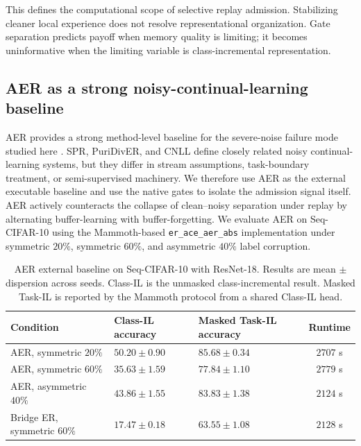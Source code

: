 \documentclass[preprint,12pt]{elsarticle}
\begin{document}
This defines the computational scope of selective replay admission. Stabilizing cleaner local experience does not resolve representational organization. Gate separation predicts payoff when memory quality is limiting; it becomes uninformative when the limiting variable is class-incremental representation.

\subsection{AER as a strong noisy-continual-learning baseline}

AER provides a strong method-level baseline for the severe-noise failure mode studied here \cite{Millunzi2024AER}. SPR, PuriDivER, and CNLL define closely related noisy continual-learning systems, but they differ in stream assumptions, task-boundary treatment, or semi-supervised machinery. We therefore use AER as the external executable baseline and use the native gates to isolate the admission signal itself. AER actively counteracts the collapse of clean--noisy separation under replay by alternating buffer-learning with buffer-forgetting. We evaluate AER on Seq-CIFAR-10 using the Mammoth-based \texttt{er\_ace\_aer\_abs} implementation under symmetric $20\%$, symmetric $60\%$, and asymmetric $40\%$ label corruption.

\begin{table}[htbp]
\centering
\caption{AER external baseline on Seq-CIFAR-10 with ResNet-18. Results are mean $\pm$ dispersion across seeds. Class-IL is the unmasked class-incremental result. Masked Task-IL is reported by the Mammoth protocol from a shared Class-IL head.}
\label{tab:aer_external}
\small
\begin{tabularx}{\textwidth}{l >{\centering\arraybackslash}X >{\centering\arraybackslash}X c}
\toprule
Condition & Class-IL accuracy & Masked Task-IL accuracy & Runtime \\
\midrule
AER, symmetric $20\%$ & $50.20 \pm 0.90$ & $85.68 \pm 0.34$ & $2707$ s \\
AER, symmetric $60\%$ & $35.63 \pm 1.59$ & $77.84 \pm 1.10$ & $2779$ s \\
AER, asymmetric $40\%$ & $43.86 \pm 1.55$ & $83.83 \pm 1.38$ & $2124$ s \\
Bridge ER, symmetric $60\%$ & $17.47 \pm 0.18$ & $63.55 \pm 1.08$ & $2128$ s \\
\bottomrule
\end{tabularx}
\end{table}
\end{document}
